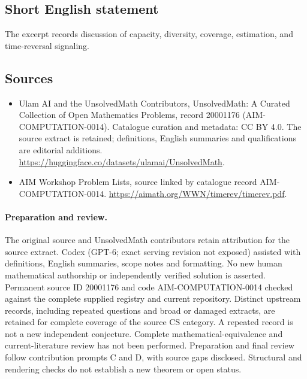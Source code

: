 \documentclass[11pt]{article}
\begin{document}
\subsection{Short English statement}
The excerpt records discussion of capacity, diversity, coverage, estimation, and time-reversal signaling.
\subsection{Sources}
\begin{itemize}
\item[\hypertarget{source:20001176:1}{S1}] Ulam AI and the UnsolvedMath Contributors, UnsolvedMath: A Curated Collection of Open Mathematics Problems, record 20001176 (AIM-COMPUTATION-0014). Catalogue curation and metadata: CC BY 4.0. The source extract is retained; definitions, English summaries and qualifications are editorial additions.
\url{https://huggingface.co/datasets/ulamai/UnsolvedMath}.
\item[\hypertarget{source:20001176:2}{S2}] AIM Workshop Problem Lists, source linked by catalogue record AIM-COMPUTATION-0014.
\url{https://aimath.org/WWN/timerev/timerev.pdf}.
\end{itemize}
\paragraph{Preparation and review.}
The original source and UnsolvedMath contributors retain attribution for the source extract. Codex (GPT-6; exact serving revision not exposed) assisted with definitions, English summaries, scope notes and formatting. No new human mathematical authorship or independently verified solution is asserted. Permanent source ID 20001176 and code AIM-COMPUTATION-0014 checked against the complete supplied registry and current repository. Distinct upstream records, including repeated questions and broad or damaged extracts, are retained for complete coverage of the source CS category. A repeated record is not a new independent conjecture. Complete mathematical-equivalence and current-literature review has not been performed. Preparation and final review follow contribution prompts C and D, with source gaps disclosed. Structural and rendering checks do not establish a new theorem or open status.
\label{end:20001176}
\end{document}
